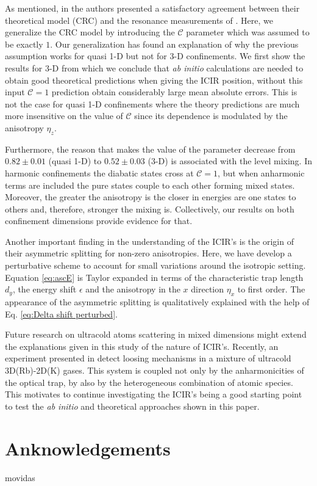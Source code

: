\documentclass[aps,pre,twocolumn,superscriptaddress,showpacs]{revtex4-1}
\newcommand{\abinitio}{\textit{ab initio }}
\begin{document}
As mentioned, in \cite{PhysRevLett.109.073201} the authors presented a satisfactory agreement between their theoretical model (CRC) and the resonance measurements of \cite{PhysRevLett.104.153203}. Here, we generalize the CRC model by introducing the $\mathcal{C}$ parameter which was assumed to be exactly $1$. Our generalization has found an explanation of why the previous assumption works for quasi 1-D  but not for 3-D confinements. We first show the results for 3-D from which we conclude that \abinitio calculations are needed to obtain good theoretical predictions when giving the ICIR position, without this input $\mathcal{C}=1$ prediction obtain considerably large mean absolute errors. This is not the case for quasi 1-D confinements where the theory predictions are much more insensitive on the value of $\mathcal{C}$ since its dependence is modulated by the anisotropy $\eta_z$. 

Furthermore, the reason that makes the value of the parameter decrease from $0.82 \pm 0.01$ (quasi 1-D) to $0.52 \pm 0.03$ (3-D) is associated with the level mixing. In harmonic confinements the diabatic states cross at $\mathcal{C}=1$, but when anharmonic terms are included the pure states couple to each other forming mixed states. Moreover, the greater the anisotropy is the closer in energies are one states to others and, therefore, stronger the mixing is. Collectively, our results on both confinement dimensions provide evidence for that.

Another important finding in the understanding of the ICIR's is the origin of their asymmetric splitting for non-zero anisotropies. Here, we have develop a perturbative scheme to account for small variations around the isotropic setting. Equation \eqref{eq:ascE} is Taylor expanded in terms of the characteristic trap length $d_y$, the energy shift $\epsilon$ and the anisotropy in the $x$ direction $\eta_x$ to first order. The appearance of the asymmetric splitting is qualitatively explained with the help of Eq. \eqref{eq:Delta shift perturbed}.

Future research on ultracold atoms scattering in mixed dimensions might extend the explanations given in this study of the nature of ICIR's. Recently, an experiment presented in \cite{PhysRevLett.104.153202} detect loosing mechanisms in a mixture of ultracold 3D(Rb)-2D(K) gases. This system is coupled not only by the anharmonicities of the optical trap, by also by the heterogeneous combination of atomic species. This motivates to continue investigating the ICIR's being a good starting point to test the \abinitio and theoretical approaches shown in this paper.
\section{Anknowledgements}
movidas



\end{document}
